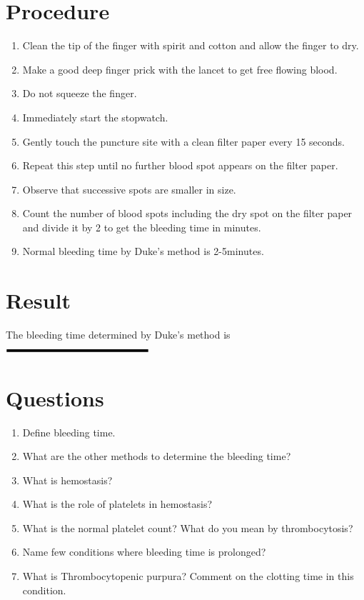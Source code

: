 \documentclass[a4paper,12pt]{book}
\begin{document}
										\section*{Procedure}
										\begin{enumerate}
											\item{Clean the tip of the finger with spirit and cotton and allow the finger to dry.}
											\item{Make a good deep finger prick with the lancet to get free flowing blood.}
											\item{Do not squeeze the finger.}
											\item{Immediately start the stopwatch.}
											\item{Gently touch the puncture site with a clean filter paper every 15 seconds.}
											\item{Repeat this step until no further blood spot appears on the filter paper.}
											\item{Observe that successive spots are smaller in size.}
											\item{Count the number of blood spots including the dry spot on the filter paper and divide it by 2 to get the bleeding time in minutes.}
											\item{Normal bleeding time by Duke’s method is 2-5minutes.}
										\end{enumerate}
										\section*{Result}
										The bleeding time determined by Duke’s method is $\rule{5cm}{0.1cm}$
										\section*{Questions}
										\begin{enumerate}
											\item{Define bleeding time.}
											\item{What are the other methods to determine the bleeding time?}
											\item{What is hemostasis?}
											\item{What is the role of platelets in hemostasis?}
											\item{What is the normal platelet count? What do you mean by thrombocytosis?}
											\item{Name few conditions where bleeding time is prolonged?}
											\item{What is Thrombocytopenic purpura? Comment on the clotting time in this condition.}
										\end{enumerate}
\end{document}
